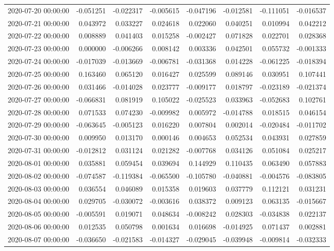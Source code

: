 \begin{tabular}{lrrrrrrr}
2020-07-20 00:00:00 & -0.051251 & -0.022317 & -0.005615 & -0.047196 & -0.012581 & -0.111051 & -0.016537 \\
2020-07-21 00:00:00 & 0.043972 & 0.033227 & 0.024618 & 0.022060 & 0.040251 & 0.010994 & 0.042212 \\
2020-07-22 00:00:00 & 0.008889 & 0.041403 & 0.015258 & -0.002427 & 0.071828 & 0.022701 & 0.028368 \\
2020-07-23 00:00:00 & 0.000000 & -0.006266 & 0.008142 & 0.003336 & 0.042501 & 0.055732 & -0.001333 \\
2020-07-24 00:00:00 & -0.017039 & -0.013669 & -0.006781 & -0.031368 & 0.014228 & -0.061225 & -0.018394 \\
2020-07-25 00:00:00 & 0.163460 & 0.065120 & 0.016427 & 0.025599 & 0.089146 & 0.030951 & 0.107441 \\
2020-07-26 00:00:00 & 0.031466 & -0.014028 & 0.023777 & -0.009177 & 0.018797 & -0.023189 & -0.021374 \\
2020-07-27 00:00:00 & -0.066831 & 0.081919 & 0.105022 & -0.025523 & 0.033963 & -0.052683 & 0.102761 \\
2020-07-28 00:00:00 & 0.071533 & 0.074230 & -0.009982 & 0.005972 & -0.014788 & 0.018515 & 0.046154 \\
2020-07-29 00:00:00 & -0.063645 & -0.005123 & 0.016220 & 0.007804 & 0.002014 & -0.020484 & -0.011702 \\
2020-07-30 00:00:00 & 0.009950 & 0.013170 & 0.000146 & 0.004653 & 0.052534 & 0.043931 & 0.027859 \\
2020-07-31 00:00:00 & -0.012812 & 0.031124 & 0.021282 & -0.007768 & 0.034126 & 0.051084 & 0.025217 \\
2020-08-01 00:00:00 & 0.035881 & 0.059454 & 0.039694 & 0.144929 & 0.110435 & 0.063490 & 0.057883 \\
2020-08-02 00:00:00 & -0.074587 & -0.119384 & -0.065500 & -0.105780 & -0.040881 & -0.004576 & -0.083805 \\
2020-08-03 00:00:00 & 0.036554 & 0.046089 & 0.015358 & 0.019603 & 0.037779 & 0.112121 & 0.031231 \\
2020-08-04 00:00:00 & 0.029705 & -0.030072 & -0.003616 & 0.038372 & 0.009123 & 0.063135 & -0.015667 \\
2020-08-05 00:00:00 & -0.005591 & 0.019071 & 0.048634 & -0.008242 & 0.028303 & -0.034838 & 0.022137 \\
2020-08-06 00:00:00 & 0.012535 & 0.050798 & 0.001634 & 0.016698 & -0.014925 & 0.071437 & 0.002881 \\
2020-08-07 00:00:00 & -0.036650 & -0.021583 & -0.014327 & -0.029045 & -0.039948 & -0.009814 & -0.032333 \\

\end{tabular}
